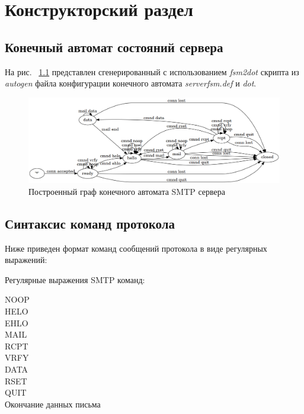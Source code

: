 \documentclass[a4paper,12pt]{report}
\begin{document}
\chapter{Конструкторский раздел}

\section{Конечный автомат состояний сервера}

На рис. ~\ref{fig:serverfsm} представлен сгенерированный с использованием \textit{fsm2dot} скрипта из \textit{autogen}
файла конфигурации конечного автомата \textit{serverfsm.def} и \textit{dot}.

\begin{figure}
    \centering
    \includegraphics[width=\textwidth]{../images/serverfsm.png}
    \caption{Построенный граф конечного автомата SMTP сервера}
    \label{fig:serverfsm}
\end{figure}

\newpage


\section{Синтаксис команд протокола}
Ниже приведен формат команд сообщений протокола в виде регулярных выражений:

Регулярные выражения SMTP команд:
\begin{description}
    \item[NOOP]
    
    \item[HELO]
    
    \item[EHLO]
    
    \item[MAIL]
    
    \item[RCPT]
    
    \item[VRFY]
    
    \item[DATA]
    
    \item[RSET]
    
    \item[QUIT]
    
    \item[Окончание данных письма]
    
\end{description}
\end{document}
